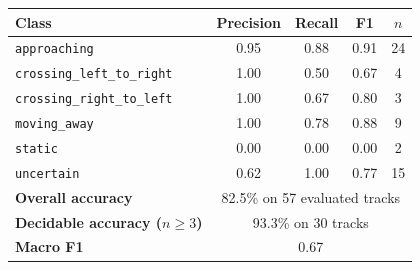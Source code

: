 \begin{tabular}{lcccc}
\toprule
Class & Precision & Recall & F1 & $n$ \\
\midrule
\texttt{approaching} & 0.95 & 0.88 & 0.91 & 24 \\
\texttt{crossing\_left\_to\_right} & 1.00 & 0.50 & 0.67 & 4 \\
\texttt{crossing\_right\_to\_left} & 1.00 & 0.67 & 0.80 & 3 \\
\texttt{moving\_away} & 1.00 & 0.78 & 0.88 & 9 \\
\texttt{static} & 0.00 & 0.00 & 0.00 & 2 \\
\texttt{uncertain} & 0.62 & 1.00 & 0.77 & 15 \\
\midrule
\textbf{Overall accuracy} & \multicolumn{4}{c}{82.5\% on 57 evaluated tracks} \\
\textbf{Decidable accuracy ($n\!\geq\!3$)} & \multicolumn{4}{c}{93.3\% on 30 tracks} \\
\textbf{Macro F1} & \multicolumn{4}{c}{0.67} \\
\bottomrule
\end{tabular}
